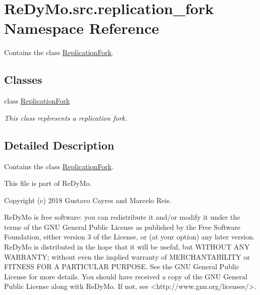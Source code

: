 \hypertarget{namespaceReDyMo_1_1src_1_1replication__fork}{}\section{Re\+Dy\+Mo.\+src.\+replication\+\_\+fork Namespace Reference}
\label{namespaceReDyMo_1_1src_1_1replication__fork}


Contains the class \mbox{\hyperlink{classReDyMo_1_1src_1_1replication__fork_1_1ReplicationFork}{Replication\+Fork}}.  


\subsection*{Classes}
\begin{DoxyCompactItemize}
\item 
class \mbox{\hyperlink{classReDyMo_1_1src_1_1replication__fork_1_1ReplicationFork}{Replication\+Fork}}
\begin{DoxyCompactList}\small\item\em This class replresents a replication fork. \end{DoxyCompactList}\end{DoxyCompactItemize}


\subsection{Detailed Description}
Contains the class \mbox{\hyperlink{classReDyMo_1_1src_1_1replication__fork_1_1ReplicationFork}{Replication\+Fork}}. 

\begin{DoxyVerb}This file is part of ReDyMo.

  Copyright (c) 2018  Gustavo Cayres and Marcelo Reis.

  ReDyMo is free software: you can redistribute it and/or modify it
  under the terms of the GNU General Public License as published by the
  Free Software Foundation, either version 3 of the License, or (at your
  option) any later version.
  ReDyMo is distributed in the hope that it will be useful, but WITHOUT
  ANY WARRANTY; without even the implied warranty of MERCHANTABILITY or
  FITNESS FOR A PARTICULAR PURPOSE. See the GNU General Public License
  for more details.
  You should have received a copy of the GNU General Public License along
  with ReDyMo. If not, see <http://www.gnu.org/licenses/>.
\end{DoxyVerb}
